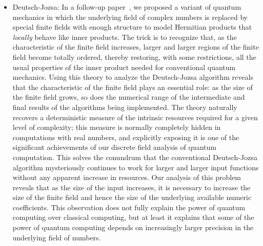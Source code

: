 \documentclass{article}
\theoremstyle{remark}
\begin{document}
\begin{itemize}
\item Deutsch-Jozsa: In a follow-up paper~\cite{DQT2014}, we proposed
  a variant of quantum mechanics in which the underlying field of
  complex numbers is replaced by special finite fields with enough
  structure to model Hermitian products that \emph{locally} behave
  like inner products. The trick is to recognize that, as the
  characteristic of the finite field increases, larger and larger
  regions of the finite field become totally ordered, thereby
  restoring, with some restrictions, all the usual properties of the
  inner product needed for conventional quantum mechanics. Using this
  theory to analyze the Deutsch-Jozsa algorithm reveals that the
  characteristic of the finite field plays an essential role: as the
  size of the finite field grows, so does the numerical range of the
  intermediate and final results of the algorithms being implemented.
  The theory naturally recovers a deterministic measure of the
  intrinsic resources required for a given level of complexity; this
  measure is normally completely hidden in computations with real
  numbers, and explicitly exposing it is one of the significant
  achievements of our discrete field analysis of quantum computation.
  This solves the conundrum that the conventional Deutsch-Jozsa
  algorithm mysteriously continues to work for larger and larger input
  functions without any apparent increase in resources.  Our analysis
  of this problem reveals that as the size of the input increases, it
  is necessary to increase the size of the finite field and hence the
  size of the underlying available numeric coefficients.  This
  observation does not fully explain the power of quantum computing
  over classical computing, but at least it explains that some of the
  power of quantum computing depends on increasingly larger precision
  in the underlying field of numbers.

\end{itemize}
\end{document}
